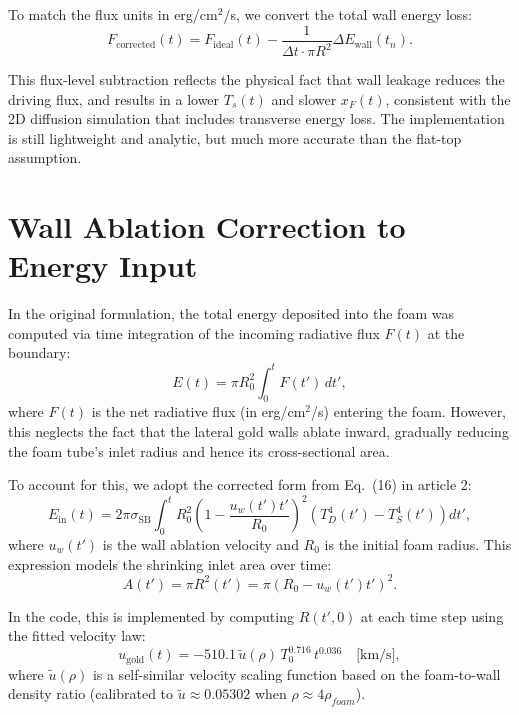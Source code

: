 \documentclass{article}
\begin{document}
To match the flux units in erg/cm$^2$/s, we convert the total wall energy loss:
\begin{equation}
F_{\text{corrected}}(t) = F_{\text{ideal}}(t) - \frac{1}{\Delta t \cdot \pi R^2}\Delta E_{\text{wall}}(t_n).
\end{equation}

This flux-level subtraction reflects the physical fact that wall leakage reduces the driving flux, and results in a lower $T_s(t)$ and slower $x_F(t)$, consistent with the 2D diffusion simulation that includes transverse energy loss. The implementation is still lightweight and analytic, but much more accurate than the flat-top assumption.

\section{Wall Ablation Correction to Energy Input}

In the original formulation, the total energy deposited into the foam was computed via time integration of the incoming radiative flux $F(t)$ at the boundary:
\begin{equation}
E(t) = \pi R_0^2\int_0^t F(t')\,dt',
\end{equation}
where $F(t)$ is the net radiative flux (in erg/cm$^2$/s) entering the foam. However, this neglects the fact that the lateral gold walls ablate inward, gradually reducing the foam tube’s inlet radius and hence its cross-sectional area.

To account for this, we adopt the corrected form from Eq.~(16) in article 2:
\begin{equation}
E_{\text{in}}(t) = 2\pi \sigma_{\mathrm{SB}} \int_0^t R_0^2 \left(1 - \frac{u_w(t') t'}{R_0} \right)^2 \left( T_D^4(t') - T_S^4(t') \right) dt',
\end{equation}
where $u_w(t')$ is the wall ablation velocity and $R_0$ is the initial foam radius. This expression models the shrinking inlet area over time:
\begin{equation}
A(t') = \pi R^2(t') = \pi \left(R_0 - u_w(t') t'\right)^2.
\end{equation}

In the code, this is implemented by computing $R(t',0)$ at each time step using the fitted velocity law:
\begin{equation}
u_{\text{gold}}(t) = -510.1\, \tilde{u}(\rho)\, T_0^{0.716}\, t^{0.036} \quad \text{[km/s]},
\end{equation}
where $\tilde{u}(\rho)$ is a self-similar velocity scaling function based on the foam-to-wall density ratio (calibrated to $\tilde{u}\approx 0.05302$ when $\rho \approx 4\rho_{foam}$).
\end{document}
